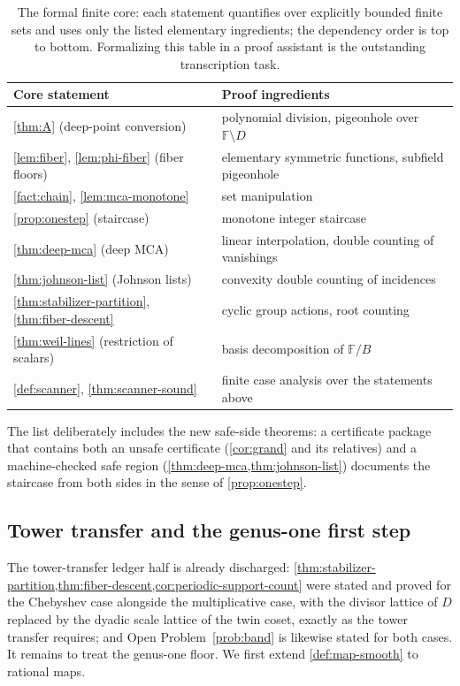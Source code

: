 \documentclass[11pt]{article}
\theoremstyle{definition}
\theoremstyle{remark}
\newcommand{\F}{\mathbb{F}}
\newcommand{\B}{B}
\begin{document}
\begin{table}[ht]
\centering
\small
\begin{tabular}{@{}ll@{}}
\toprule
Core statement & Proof ingredients \\
\midrule
\cref{thm:A} (deep-point conversion) & polynomial division, pigeonhole over $\F\setminus D$ \\
\cref{lem:fiber}, \cref{lem:phi-fiber} (fiber floors) & elementary symmetric functions, subfield pigeonhole \\
\cref{fact:chain}, \cref{lem:mca-monotone} & set manipulation \\
\cref{prop:onestep} (staircase) & monotone integer staircase \\
\cref{thm:deep-mca} (deep MCA) & linear interpolation, double counting of vanishings \\
\cref{thm:johnson-list} (Johnson lists) & convexity double counting of incidences \\
\cref{thm:stabilizer-partition}, \cref{thm:fiber-descent} & cyclic group actions, root counting \\
\cref{thm:weil-lines} (restriction of scalars) & basis decomposition of $\F/\B$ \\
\cref{def:scanner}, \cref{thm:scanner-sound} & finite case analysis over the statements above \\
\bottomrule
\end{tabular}
\caption{The formal finite core: each statement quantifies over explicitly bounded finite sets and uses only the listed elementary ingredients; the dependency order is top to bottom. Formalizing this table in a proof assistant is the outstanding transcription task.}
\label{tab:core}
\end{table}

The list deliberately includes the new safe-side theorems: a certificate package that contains both an unsafe certificate \textup(\cref{cor:grand} and its relatives\textup) and a machine-checked safe region \textup(\cref{thm:deep-mca,thm:johnson-list}\textup) documents the staircase from both sides in the sense of \cref{prop:onestep}.

\subsection{Tower transfer and the genus-one first step}\label{sec:discharge-T8}

The tower-transfer ledger half is already discharged: \cref{thm:stabilizer-partition,thm:fiber-descent,cor:periodic-support-count} were stated and proved for the Chebyshev case alongside the multiplicative case, with the divisor lattice of $D$ replaced by the dyadic scale lattice of the twin coset, exactly as the tower transfer requires; and Open Problem~\ref{prob:band} is likewise stated for both cases. It remains to treat the genus-one floor. We first extend \cref{def:map-smooth} to rational maps.
\end{document}
